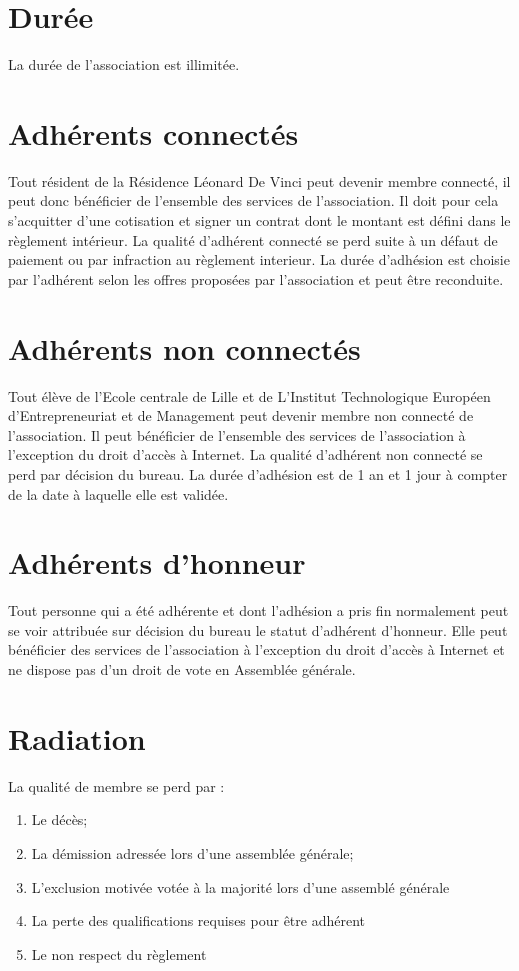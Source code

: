 \documentclass[12pt]{constitution}
\begin{document}
	\section{Durée}
	La durée de l’association est illimitée.
	
	
	\section{Adhérents connectés}
		
	Tout résident de la Résidence Léonard De Vinci peut devenir membre connecté, il peut donc bénéficier de l’ensemble des services de l’association. Il doit pour cela s’acquitter d’une cotisation et signer un contrat dont le montant est défini dans le règlement intérieur. La qualité d’adhérent connecté se perd suite à un défaut de paiement ou par infraction au règlement interieur. La durée d’adhésion est choisie par l’adhérent selon les offres proposées par l’association et peut être reconduite.
	
	\section{Adhérents non connectés}
	
	Tout élève de l’Ecole centrale de Lille et de L’Institut Technologique Européen d'Entrepreneuriat et de Management peut devenir membre non connecté de l’association. Il peut bénéficier de l’ensemble des services de l’association à l’exception du droit d’accès à Internet. La qualité d’adhérent non connecté se perd par décision du bureau. La durée d’adhésion est de 1 an et 1 jour à compter de la date à laquelle elle est validée.
	
	\section{Adhérents d'honneur}
	
	Tout personne qui a été adhérente et dont l’adhésion a pris fin normalement peut se voir attribuée sur décision du bureau le statut d’adhérent d’honneur. Elle peut bénéficier des services de l’association à l’exception du droit d’accès à Internet et ne dispose pas d’un droit de vote en Assemblée générale.
	
	\section{Radiation}
	La qualité de membre se perd par :
	\begin{enumerate}
		\item[\textbullet] Le décès;
		\item[\textbullet] La démission adressée lors d'une assemblée générale;
		\item[\textbullet] L'exclusion motivée votée à la majorité lors d'une assemblé générale
		\item[\textbullet] La perte des qualifications requises pour être adhérent
		\item[\textbullet] Le non respect du règlement
	\end{enumerate}
	
\end{document}
